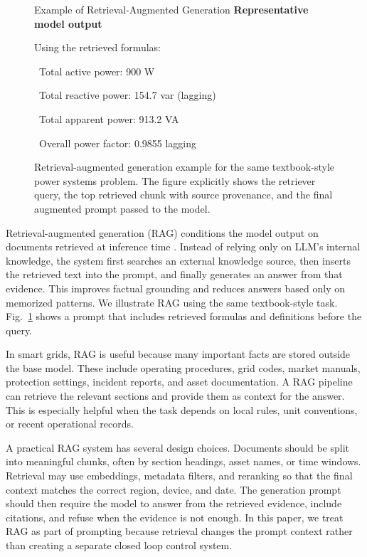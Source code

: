 \documentclass[journal,onecolumn]{IEEEtran} %
\newcommand{\outputline}[1]{{\ttfamily #1}\par}
\newcommand{\goodmark}{\textcolor{green!50!black}{\ding{51}}}
\begin{document}
\begin{figure}[tb]
\begin{minipage}{0.94\linewidth}
\begin{promptfigure}{Example of Retrieval-Augmented Generation}
\footnotesize
\textbf{Representative model output}\par\vspace{0.6mm}
\outputline{Using the retrieved formulas:}
\outputline{\goodmark\ Total active power: 900 W}
\outputline{\goodmark\ Total reactive power: 154.7 var (lagging)}
\outputline{\goodmark\ Total apparent power: 913.2 VA}
\outputline{\goodmark\ Overall power factor: 0.9855 lagging}
\end{promptfigure}
\end{minipage}
\caption{Retrieval-augmented generation example for the same textbook-style power systems problem. The figure explicitly shows the retriever query, the top retrieved chunk with source provenance, and the final augmented prompt passed to the model.}
\label{fig:rag_prompt_example}
\end{figure}
Retrieval-augmented generation (RAG) conditions the model output on documents retrieved at inference time \cite{lewis2020rag}. Instead of relying only on LLM's internal knowledge, the system first searches an external knowledge source, then inserts the retrieved text into the prompt, and finally generates an answer from that evidence. This improves factual grounding and reduces answers based only on memorized patterns. We illustrate RAG using the same textbook-style task. Fig.~\ref{fig:rag_prompt_example} shows a prompt that includes retrieved formulas and definitions before the query.

In smart grids, RAG is useful because many important facts are stored outside the base model. These include operating procedures, grid codes, market manuals, protection settings, incident reports, and asset documentation. A RAG pipeline can retrieve the relevant sections and provide them as context for the answer. This is especially helpful when the task depends on local rules, unit conventions, or recent operational records.

A practical RAG system has several design choices. Documents should be split into meaningful chunks, often by section headings, asset names, or time windows. Retrieval may use embeddings, metadata filters, and reranking so that the final context matches the correct region, device, and date. The generation prompt should then require the model to answer from the retrieved evidence, include citations, and refuse when the evidence is not enough. In this paper, we treat RAG as part of prompting because retrieval changes the prompt context rather than creating a separate closed loop control system.
\end{document}
